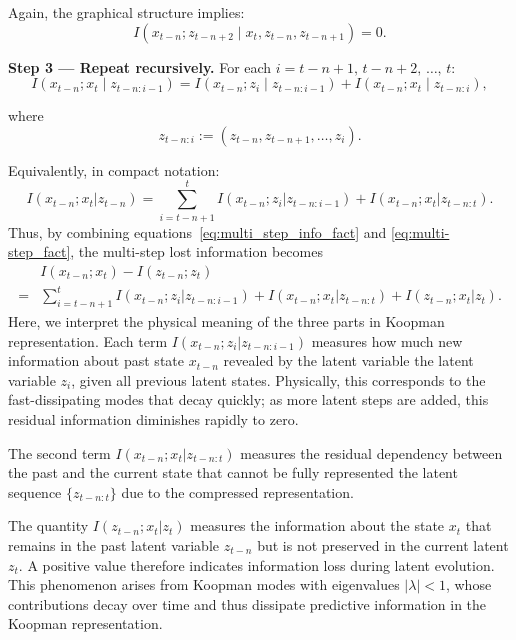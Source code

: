\documentclass{article} %
\begin{document}
Again, the graphical structure implies:
\[
I(x_{t-n}; z_{t-n+2} \mid x_t, z_{t-n}, z_{t-n+1}) = 0.
\]


\textbf{Step 3 — Repeat recursively.} For each $i = t - n + 1,\, t - n + 2,\, \ldots,\, t$:
\[
I(x_{t-n}; x_t \mid z_{t-n:i-1})
= I(x_{t-n}; z_i \mid z_{t-n:i-1})
+ I(x_{t-n}; x_t \mid z_{t-n:i}),
\]

where
\[
z_{t-n:i} := (z_{t-n}, z_{t-n+1}, \ldots, z_i).
\]

Equivalently, in compact notation:
\begin{equation} \label{eq:multi-step_fact}
    I(x_{t-n}; x_t | z_{t-n})
= \sum_{i = t-n+1}^t I(x_{t-n}; z_i | z_{t-n:i-1})
+ I(x_{t-n}; x_t | z_{t-n:t}). 
\end{equation}
Thus, by combining equations~\ref{eq:multi_step_info_fact} and \ref{eq:multi-step_fact}, the multi-step lost information becomes 
\begin{equation}
\begin{split}
 & I(x_{t-n}; x_t) -  I(z_{t-n}; z_t) \\
 = & \sum_{i = t-n+1}^t I(x_{t-n}; z_i | z_{t-n:i-1})
+ I(x_{t-n}; x_t | z_{t-n:t}) + I(z_{t-n}; x_t|z_t). 
\end{split}
\end{equation}
Here, we interpret the physical meaning of the three parts in Koopman representation. Each term $I(x_{t-n}; z_i | z_{t-n:i-1})$ measures how much new information about past state $x_{t-n}$ revealed by the latent variable the latent variable $z_i$, given all previous latent states. Physically, this corresponds to the fast-dissipating modes that decay quickly; as more latent steps are added, this residual information diminishes rapidly to zero. 

The second term $I(x_{t-n}; x_t | z_{t-n:t})$ measures the residual dependency between the past and the current state that cannot be fully represented the latent sequence $\{z_{t-n:t}\}$ due to the compressed representation. 

The quantity $I(z_{t-n}; x_t | z_t)$ measures the information about the state $x_t$ that remains in the past latent variable $z_{t-n}$ but is not preserved in the current latent $z_t$. A positive value therefore indicates information loss during latent evolution. This phenomenon arises from Koopman modes with eigenvalues $|\lambda| < 1$, whose contributions decay over time and thus dissipate predictive information in the Koopman representation. 

\clearpage
\end{document}
